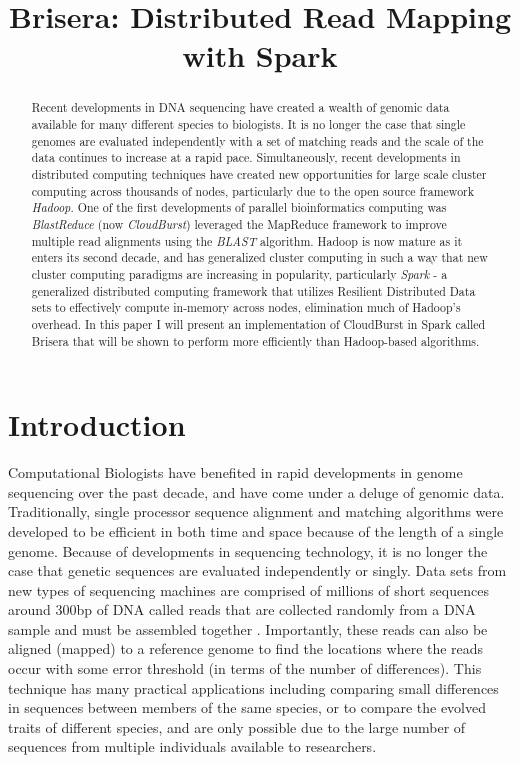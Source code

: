 \documentclass[conference,letterpaper,11pt]{IEEEtran}
\title{Brisera: Distributed Read Mapping with Spark}
\author{
\IEEEauthorblockN{Benjamin~Bengfort}
\IEEEauthorblockA{University~of~Maryland\\ 
bengfort@cs.umd.edu}
}
\begin{document}
	
	\maketitle

\begin{abstract}
	Recent developments in DNA sequencing have created a wealth of genomic data available for many different species to biologists.  It is no longer the case that single genomes are evaluated independently with a set of matching reads and the scale of the data continues to increase at a rapid pace. Simultaneously, recent developments in distributed computing techniques have created new opportunities for large scale cluster computing across thousands of nodes, particularly due to the open source framework \textit{Hadoop}. One of the first developments of parallel bioinformatics computing was \textit{BlastReduce} (now \textit{CloudBurst}) leveraged the MapReduce framework to improve multiple read alignments using the \textit{BLAST} algorithm. Hadoop is now mature as it enters its second decade, and has generalized cluster computing in such a way that new cluster computing paradigms are increasing in popularity, particularly \textit{Spark} - a generalized distributed computing framework that utilizes Resilient Distributed Data sets to effectively compute in-memory across nodes, elimination much of Hadoop's overhead. In this paper I will present an implementation of CloudBurst in Spark called Brisera that will be shown to perform more efficiently than Hadoop-based algorithms. 
\end{abstract}


\section{Introduction}
	Computational Biologists have benefited in rapid developments in genome sequencing over the past decade, and have come under a deluge of genomic data. Traditionally, single processor sequence alignment and matching algorithms were developed to be efficient in both time and space because of the length of a single genome. Because of developments in sequencing technology, it is no longer the case that genetic sequences are evaluated independently or singly. Data sets from new types of sequencing machines are comprised of millions of short sequences around 300bp of DNA called reads that are collected randomly from a DNA sample and must be assembled together \cite{bankier_shotgun_2001}. Importantly, these reads can also be aligned (mapped) to a reference genome to find the locations where the reads occur with some error threshold (in terms of the number of differences). This technique has many practical applications including comparing small differences in sequences between members of the same species, or to compare the evolved traits of different species, and are only possible due to the large number of sequences from multiple individuals available to researchers.
    
\end{document}
